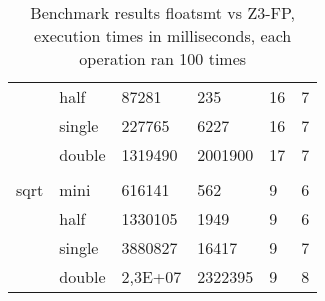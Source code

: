 \documentclass[a4paper,UKenglish,cleveref, autoref, thm-restate]{lipics-v2019}
\begin{document}
\begin{center}
\begin{table}[]
\begin{tabular}{ll|ll|ll}
			& half     & 87281      & 235      & 16         & 7        \\
			& single   & 227765     & 6227     & 16         & 7        \\
			& double   & 1319490    & 2001900  & 17         & 7        \\
			&          &            &          &            &          \\
			sqrt           & mini     & 616141     & 562      & 9          & 6        \\
			& half     & 1330105    & 1949     & 9          & 6        \\
			& single   & 3880827    & 16417    & 9          & 7        \\
			& double   & 2,3E+07    & 2322395  & 9          & 8       
		\end{tabular}
		\caption{Benchmark results floatsmt vs Z3-FP, execution times in milliseconds, each operation ran 100 times}
		\label{tab:performance}
	\end{table}
\end{center}
\end{document}
